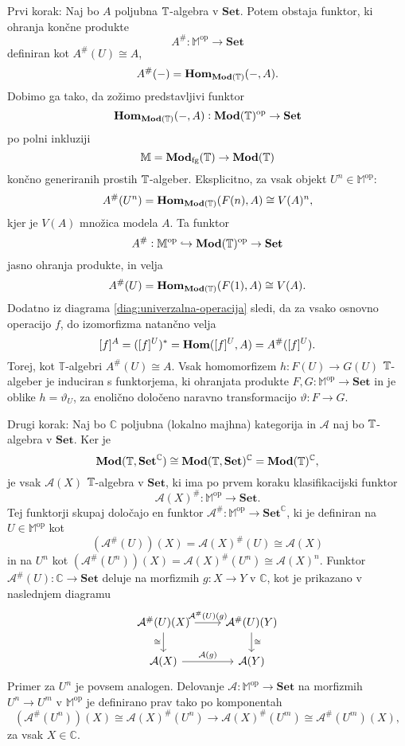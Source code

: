\documentclass[../kategoricna_logika.tex]{subfiles}
\begin{document}
\begin{dokaz}
  Prvi korak: Naj bo $A$ poljubna $\mathbb{T}$-algebra v $\mathbf{Set}$. Potem obstaja funktor,
  ki ohranja končne produkte
  \[ A^{\#}: \mathbb{M}^{\mathrm{op}} \to \mathbf{Set}\]
  definiran kot $A^{\#}(U) \cong A$,
  \[ A^{\#}(-) = \mathbf{Hom}_{\mathbf{Mod}(\mathbb{T})}(-,A).\]
  Dobimo ga tako, da zožimo predstavljivi funktor
  \[ \mathbf{Hom}_{\mathbf{Mod}(\mathbb{T})}(-,A) : \mathbf{Mod}(\mathbb{T})^{\mathrm{op}} \to \mathbf{Set}\]
  po polni inkluziji
  \[ \mathbb{M} = \mathbf{Mod}_{\mathrm{fg}}(\mathbb{T}) \to \mathbf{Mod}(\mathbb{T})\]
  končno generiranih prostih $\mathbb{T}$-algeber. Eksplicitno, za vsak objekt
  $U^n \in \mathbb{M}^{\mathrm{op}}$:
  \[ A^{\#}(U^n) = \mathbf{Hom}_{\mathbf{Mod}(\mathbb{T})}(F(n), A) \cong V(A)^{n}, \]
  kjer je $V(A)$ množica modela $A$. Ta funktor
  \[ A^{\#} : \mathbb{M}^{\mathrm{op}} \hookrightarrow \mathbf{Mod}(\mathbb{T})^{\mathrm{op}} \to \mathbf{Set}\]
  jasno ohranja produkte, in velja
  \[ A^{\#}(U) = \mathbf{Hom}_{\mathbf{Mod}(\mathbb{T})}(F(1), A) \cong V(A).\]
  Dodatno iz diagrama \eqref{diag:univerzalna-operacija} sledi, da za vsako osnovno operacijo $f$,
  do izomorfizma natančno velja
  \[ [f]^A = ([f]^U)^{*} = \mathbf{Hom}([f]^U,A) = A^{\#}([f]^U).\]
  Torej, kot $\mathbb{T}$-algebri $A^{\#}(U) \cong A$.
  Vsak homomorfizem $h : F(U) \to G(U)$ $\mathbb{T}$-algeber
  je induciran s funktorjema, ki ohranjata produkte
  ${F,G : \mathbb{M}^{\mathrm{op}} \to \mathbf{Set}}$
  in je oblike $h = \vartheta_U$, za enolično določeno naravno transformacijo $\vartheta : F \to G$.

  Drugi korak: Naj bo $\mathbb{C}$ poljubna (lokalno majhna) kategorija in $\mathcal{A}$ naj bo
  $\mathbb{T}$-algebra v $\mathbf{Set}$. Ker je
  \[ \mathbf{Mod}(\mathbb{T}, \mathbf{Set}^{\mathbb{C}}) \cong
    \mathbf{Mod}(\mathbb{T}, \mathbf{Set})^{\mathbb{C}} = \mathbf{Mod}(\mathbb{T})^{\mathbb{C}},\]
  je vsak $\mathcal{A}(X)$ $\mathbb{T}$-algebra v $\mathbf{Set}$,
  ki ima po prvem koraku klasifikacijski funktor
  \[ \mathcal{A}(X)^{\#} : \mathbb{M}^{\mathrm{op}} \to \mathbf{Set}.\]
  Tej funktorji skupaj določajo en funktor
  $\mathcal{A}^{\#} : \mathbb{M}^{\mathrm{op}} \to \mathbf{Set}^{\mathbb{C}}$,
  ki je definiran na $U \in \mathbb{M}^{\mathrm{op}}$ kot
  \[ (\mathcal{A}^{\#}(U))(X) = \mathcal{A}(X)^{\#}(U) \cong \mathcal{A}(X)\]
  in na $U^n$ kot $(\mathcal{A}^{\#}(U^{n}))(X) = \mathcal{A}(X)^{\#}(U^n) \cong \mathcal{A}(X)^n$.
  Funktor ${\mathcal{A}^{\#}(U) : \mathbb{C} \to \mathbf{Set}}$ deluje na morfizmih $g : X \to Y$ v
  $\mathbb{C}$, kot je prikazano v naslednjem diagramu
  \begin{equation*}
    \begin{tikzcd}
      \mathcal{A}^{\#}(U)(X) \ar[d, "\cong"'] \ar[r, "{\mathcal{A}^{\#}(U)(g)}"] &
      \mathcal{A}^{\#}(U)(Y) \ar[d, "\cong"] \\
      \mathcal{A}(X) \ar[r, "{\mathcal{A}(g)}"] & \mathcal{A}(Y)
    \end{tikzcd}
  \end{equation*}
  Primer za $U^n$ je povsem analogen. Delovanje
  $\mathcal{A} : \mathbb{M}^{\mathrm{op}} \to \mathbf{Set}$ na morfizmih $U^n \to U^m$
  v $\mathbb{M}^{\mathrm{op}}$ je definirano prav tako po komponentah
  \[ (\mathcal{A}^{\#}(U^n))(X) \cong \mathcal{A}(X)^{\#}(U^n) \to
    \mathcal{A}(X)^{\#}(U^m) \cong \mathcal{A}^{\#}(U^m)(X),\]
  za vsak $X \in \mathbb{C}$.


\end{dokaz}
\end{document}
